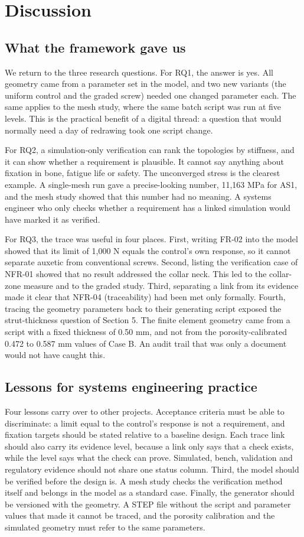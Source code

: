 \documentclass[10pt,twocolumn,letterpaper]{article}
\begin{document}
\section{Discussion}
\subsection{What the framework gave us}
We return to the three research questions. For RQ1, the answer is yes. All geometry came from a parameter set in the model, and two new variants (the uniform control and the graded screw) needed one changed parameter each. The same applies to the mesh study, where the same batch script was run at five levels. This is the practical benefit of a digital thread: a question that would normally need a day of redrawing took one script change.

For RQ2, a simulation-only verification can rank the topologies by stiffness, and it can show whether a requirement is plausible. It cannot say anything about fixation in bone, fatigue life or safety. The unconverged stress is the clearest example. A single-mesh run gave a precise-looking number, 11,163 MPa for AS1, and the mesh study showed that this number had no meaning. A systems engineer who only checks whether a requirement has a linked simulation would have marked it as verified.

For RQ3, the trace was useful in four places. First, writing FR-02 into the model showed that its limit of 1,000 N equals the control's own response, so it cannot separate auxetic from conventional screws. Second, listing the verification case of NFR-01 showed that no result addressed the collar neck. This led to the collar-zone measure and to the graded study. Third, separating a link from its evidence made it clear that NFR-04 (traceability) had been met only formally. Fourth, tracing the geometry parameters back to their generating script exposed the strut-thickness question of Section 5. The finite element geometry came from a script with a fixed thickness of 0.50 mm, and not from the porosity-calibrated 0.472 to 0.587 mm values of Case B. An audit trail that was only a document would not have caught this.

\subsection{Lessons for systems engineering practice}
Four lessons carry over to other projects. Acceptance criteria must be able to discriminate: a limit equal to the control's response is not a requirement, and fixation targets should be stated relative to a baseline design. Each trace link should also carry its evidence level, because a link only says that a check exists, while the level says what the check can prove. Simulated, bench, validation and regulatory evidence should not share one status column. Third, the model should be verified before the design is. A mesh study checks the verification method itself and belongs in the model as a standard case. Finally, the generator should be versioned with the geometry. A STEP file without the script and parameter values that made it cannot be traced, and the porosity calibration and the simulated geometry must refer to the same parameters.
\end{document}
